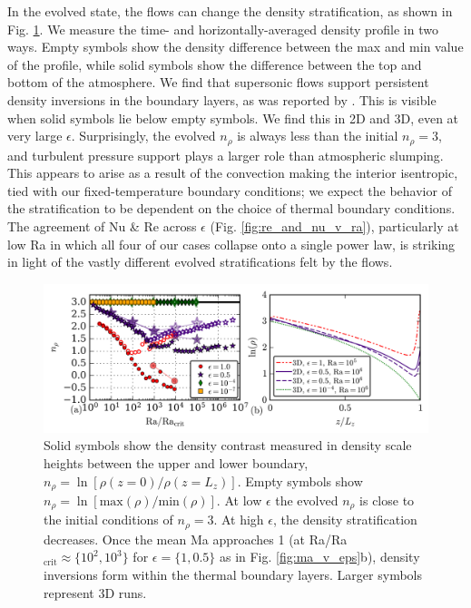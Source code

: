 \documentclass[aps, prfluids, onecolumn, notitlepage, nofootinbib, groupedaddress, amsfonts, amssymb, amsmath]{revtex4-1}
\begin{document}
In the evolved state, the flows can change the density stratification,
as shown in Fig. \ref{fig:nrho_v_ra}.
We measure the 
time- and horizontally-averaged density profile in two ways. Empty symbols
show the density difference
between the max and min value of the profile, while solid symbols
show the difference between the top and bottom of the atmosphere. 
We find that supersonic flows support persistent density inversions 
in the boundary layers, as
was reported by \cite{brandenburg&all2005}.  This is visible when
solid symbols lie below empty symbols.  We find this in 2D and 3D, even
at very large $\epsilon$.
Surprisingly, the evolved $n_\rho$ is always less than the initial $n_\rho = 3$,
and turbulent pressure support plays a larger role than atmospheric slumping.
This appears to arise as a result of the convection making the interior isentropic,
tied with our fixed-temperature boundary conditions; 
we expect the behavior of the stratification to be dependent on the choice of
thermal boundary conditions.
The agreement of Nu \& Re across $\epsilon$ (Fig. \ref{fig:re_and_nu_v_ra}), 
particularly at low Ra in which all four of our cases collapse onto a single
power law, is striking in light of the vastly different evolved stratifications
felt by the flows. 


\begin{figure}[t!]
\includegraphics[width=\textwidth]{./figs/density_v_ra.png}
\caption{\label{fig:nrho_v_ra} 
Solid symbols show the density contrast measured
in density scale heights between the upper and lower boundary, 
$n_\rho = \ln[\rho(z=0)/\rho(z=L_z)]$.
Empty symbols show 
$n_\rho = \ln[\text{max}(\rho)/\text{min}(\rho)]$. 
At low $\epsilon$ the evolved
$n_{\rho}$ is close to the initial conditions of $n_\rho = 3$.  
At high $\epsilon$,
the density stratification decreases.  Once the mean 
Ma approaches 1 (at Ra/Ra$_{\text{crit}} \approx \{10^2, 10^3\}$ for $\epsilon = \{1, 0.5\}$
as in Fig. \ref{fig:ma_v_eps}b), density inversions form within the thermal
boundary layers. Larger symbols represent 3D runs.}
\end{figure}
\end{document}
